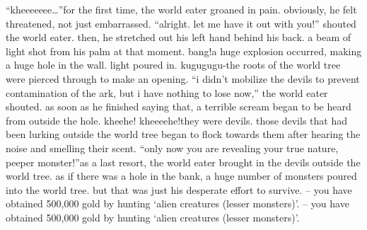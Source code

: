 “kheeeeeee…”for the first time, the world eater groaned in pain.
 obviously, he felt threatened, not just embarrassed.
“alright.
 let me have it out with you!” shouted the world eater.
then, he stretched out his left hand behind his back.
 a beam of light shot from his palm at that moment.
bang!a huge explosion occurred, making a huge hole in the wall.
 light poured in.
kugugugu-the roots of the world tree were pierced through to make an opening.
“i didn’t mobilize the devils to prevent contamination of the ark, but i have nothing to lose now,” the world eater shouted.
as soon as he finished saying that, a terrible scream began to be heard from outside the hole.
kheehe! kheeeehe!they were devils.
 those devils that had been lurking outside the world tree began to flock towards them after hearing the noise and smelling their scent.
“only now you are revealing your true nature, peeper monster!”as a last resort, the world eater brought in the devils outside the world tree.
 as if there was a hole in the bank, a huge number of monsters poured into the world tree.
 but that was just his desperate effort to survive.
– you have obtained 500,000 gold by hunting ‘alien creatures (lesser monsters)’.
– you have obtained 500,000 gold by hunting ‘alien creatures (lesser monsters)’.

